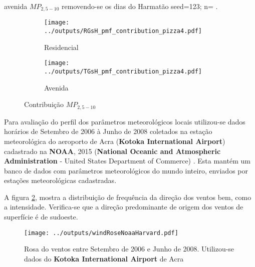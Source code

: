 \begin{table}[H]
  \centering
    
    \caption{avenida $MP_{2,5-10}$ removendo-se os dias do Harmatão 
              seed=123; n= . 
             \label{table:TGsH_profiles4}}
\end{table}


\begin{figure}[H]
  \centering
  \begin{subfigure}[b]{0.45\textwidth}
    \texttt{[image: ../outputs/RGsH\_pmf\_contribution\_pizza4.pdf]}
    \caption{Residencial}
  \end{subfigure}%
  \begin{subfigure}[b]{0.45\textwidth}
    \texttt{[image: ../outputs/TGsH\_pmf\_contribution\_pizza4.pdf]}
    \caption{Avenida}
  \end{subfigure}
  \caption{Contribuição $MP_{2,5-10}$ \label{qqq}}
\end{figure}


Para avaliação do perfil dos parâmetros meteorológicos locais
utilizou-se dados horários de Setembro de 2006 à Junho de 2008 
coletados na estação meteorológica do aeroporto de Acra 
(\textbf{Kotoka International Airport}) cadastrado na \textbf{NOAA}, 2015 (\textbf{National Oceanic 
and Atmospheric Administration} - United States Department of Commerce)%
. Esta mantém um banco de dados com parâmetros 
meteorológicos do mundo inteiro, enviados por estações meteorológicas 
cadastradas.

A figura \ref{fg:rosaCompleta}, 
mostra a distribuição de frequência da direção dos ventos bem, como a 
intensidade. Verifica-se que a direção predominante de origem dos ventos de superfície
é de sudoeste. 

\begin{figure}[H]
  \centering
  \texttt{[image: ../outputs/windRoseNoaaHarvard.pdf]}
  \caption{Rosa do ventos entre
           Setembro de 2006 e Junho de 2008. Utilizou-se dados 
           do \textbf{Kotoka International Airport} de Acra 
           \label{fg:rosaCompleta}}
\end{figure}%

